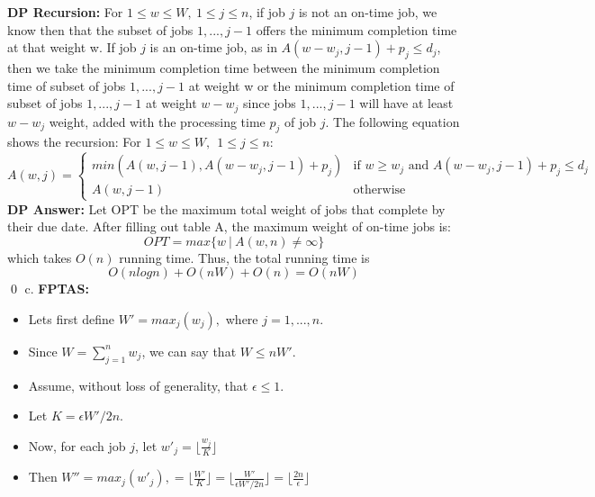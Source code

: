 \documentclass[oneside]{homework} %
\begin{document}
\newline
\newline
\textbf{DP Recursion:} 
\newline
For $1 \leq w \leq W, \ 1 \leq j \leq n$, if job $j$ is not an on-time job, we know then that the subset of jobs $1,...,j-1$ offers the minimum completion time at that weight w. If job $j$ is an on-time job, as in $A(w-w_j, j-1) + p_j \leq d_j$, then we take the minimum completion time between the minimum completion time of subset of jobs $1,...,j-1$ at weight w or the minimum completion time of subset of jobs $1,...,j-1$ at weight $w-w_j$ since jobs $1,...,j-1$ will have at least $w-w_j$ weight, added with the processing time $p_j$ of job $j$. The following equation shows the recursion:
\newline
\newline
For $1 \leq w \leq W, \ \ 1 \leq j \leq n$:
\begin{equation}
  A(w,j) =
  \begin{cases}
    min(A(w, j-1), A(w-w_j, j-1) + p_j) & \text{if $w \geq w_j$ and $A(w-w_j, j-1) + p_j \leq d_j$} \\
    A(w, j-1) & \text{otherwise}
  \end{cases}
\end{equation}
\newline
\textbf{DP Answer:}
\newline
Let OPT be the maximum total weight of jobs that complete by their due date. After filling out table A, the maximum weight of on-time jobs is: $$OPT = max\{ w \ | \ A(w,n) \neq \infty \}$$ which takes $O(n)$ running time. Thus, the total running time is $$O(nlogn) + O(nW) + O(n) = O(nW)$$ \hfill\qed
\newline
\newline
{\large c.} \textbf{FPTAS:}
\begin{itemize}
  \item Lets first define $W' = max_j (w_j),$ where $j = 1,...,n$.
  \item Since $W = \sum\limits_{j=1}^{n}w_j$, we can say that $W \leq nW'$.
  \item Assume, without loss of generality, that $\epsilon \leq 1$.
  \item Let $K = \epsilon W' / 2n$.
  \item Now, for each job $j$, let $w'_j = \lfloor\frac{w_j}{K}\rfloor$
  \item Then $W'' = max_j(w'_j) ,= \lfloor\frac{W'}{K}\rfloor = \lfloor\frac{W'}{\epsilon W'/2n}\rfloor = \lfloor\frac{2n}{\epsilon}\rfloor$
\end{itemize}
\end{document}
